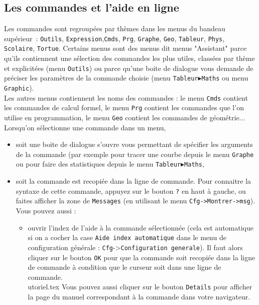\documentclass{article}
\begin{document}
\begin{giacjshere}
\subsection{Les commandes et l'aide en ligne}
%
Les commandes sont regroup\'ees par th\`emes dans les
menus du bandeau sup\'erieur~: \verb|Outils|, \verb|Expression|,\verb|Cmds|,
\verb|Prg|, \verb|Graphe|,
\verb|Geo|, \verb|Tableur|,  \verb|Phys|, \verb|Scolaire|, \verb|Tortue|. 
Certains menus sont des menus dit menus "Assistant" parce qu'ils
contiennent
une s\'election des commandes  les plus utiles,
class\'ees par th\`eme et explicit\'ees (menu {\tt Outils}) ou parce 
qu'une boite de dialogue vous demande de 
pr\'eciser les param\`etres de la commande choisie (menu 
{\tt Tableur$\blacktriangleright$Maths} ou menu {\tt Graphic}).\\
Les autres menus contiennent les noms des commandes : 
le menu {\tt Cmds} contient les commandes de calcul formel, 
le menu {\tt Prg} contient les commandes que l'on utilise en  
programmation,
le menu {\tt Geo} contient les commandes de g\'eom\'etrie...
Lorsqu'on s\'electionne une commande dans un menu, 
\begin{itemize}
\item soit une boite de dialogue s'ouvre vous permettant de sp\'ecifier
les arguments de la commande (par exemple pour tracer une courbe
depuis le menu \verb|Graphe| ou pour faire des statistiques depuis le menu 
{\tt Tableur$\blacktriangleright$Maths},
\item soit la commande est recopi\'ee dans la ligne de commande. Pour connaitre
la syntaxe de cette commande, appuyez sur le bouton \verb|?| en haut \`a 
gauche, ou faites afficher la zone de \verb|Messages| (en utilisant le menu 
\verb|Cfg->Montrer->msg|). \\
Vous pouvez aussi :
\begin{itemize}
\item ouvrir l'index de l'aide \`a la commande s\'electionn\'ee
(cela est  automatique si on  a cocher la case 
\verb|Aide index automatique| dans le menu de configuration 
g\'en\'erale : \verb|Cfg|->\verb|Configuration generale|). Il faut alors 
cliquer sur le bouton {\tt OK} pour que la commande soit recopi\'ee dans la 
ligne de commande \`a condition que le curseur soit dans une ligne de 
commande.\\utoriel.tex
Vous pouvez aussi cliquer sur le bouton
\verb|Details| pour afficher la page du manuel correspondant \`a la commande
dans votre navigateur. 


\end{itemize}
\end{itemize}
\end{giacjshere}
\end{document}
